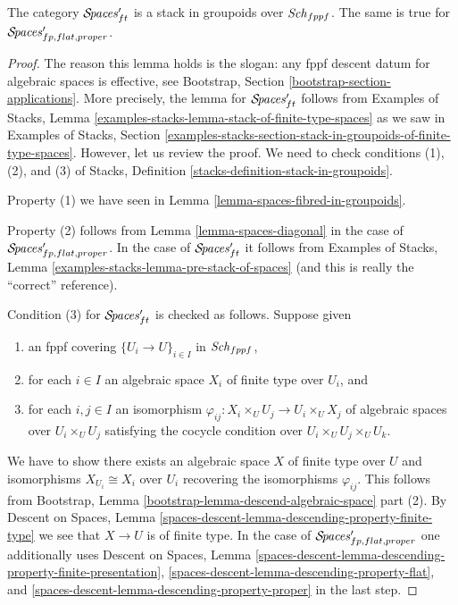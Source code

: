 \begin{lemma}
\label{lemma-spaces-stack}
The category $\mathcal{S}\!\mathit{paces}'_{ft}$ is a stack in groupoids
over $\mathit{Sch}_{fppf}$. The same is true for
$\mathcal{S}\!\mathit{paces}'_{fp, flat, proper}$.
\end{lemma}

\begin{proof}
The reason this lemma holds is the slogan: any fppf descent datum for algebraic
spaces is effective, see Bootstrap, Section
\ref{bootstrap-section-applications}.
More precisely, the lemma for $\mathcal{S}\!\mathit{paces}'_{ft}$ follows from
Examples of Stacks, Lemma
\ref{examples-stacks-lemma-stack-of-finite-type-spaces}
as we saw in Examples of Stacks, Section
\ref{examples-stacks-section-stack-in-groupoids-of-finite-type-spaces}.
However, let us review the proof. We need to check conditions
(1), (2), and (3) of Stacks, Definition
\ref{stacks-definition-stack-in-groupoids}.

\medskip\noindent
Property (1) we have seen in Lemma \ref{lemma-spaces-fibred-in-groupoids}.

\medskip\noindent
Property (2) follows from
Lemma \ref{lemma-spaces-diagonal} in the case of
$\mathcal{S}\!\mathit{paces}'_{fp, flat, proper}$.
In the case of $\mathcal{S}\!\mathit{paces}'_{ft}$ it follows
from Examples of Stacks, Lemma
\ref{examples-stacks-lemma-pre-stack-of-spaces}
(and this is really the ``correct'' reference).

\medskip\noindent
Condition (3) for $\mathcal{S}\!\mathit{paces}'_{ft}$ is checked as follows. Suppose given
\begin{enumerate}
\item an fppf covering $\{U_i \to U\}_{i \in I}$ in $\mathit{Sch}_{fppf}$,
\item for each $i \in I$ an algebraic space $X_i$ of finite type over
$U_i$, and
\item for each $i, j \in I$ an isomorphism
$\varphi_{ij} : X_i \times_U U_j \to U_i \times_U X_j$ of algebraic spaces
over $U_i \times_U U_j$ satisfying the cocycle condition over
$U_i \times_U U_j \times_U U_k$.
\end{enumerate}
We have to show there exists an algebraic space $X$ of finite type over $U$
and isomorphisms $X_{U_i} \cong X_i$ over $U_i$ recovering the
isomorphisms $\varphi_{ij}$. This follows from
Bootstrap, Lemma \ref{bootstrap-lemma-descend-algebraic-space} part (2).
By Descent on Spaces, Lemma
\ref{spaces-descent-lemma-descending-property-finite-type}
we see that $X \to U$ is of finite type.
In the case of $\mathcal{S}\!\mathit{paces}'_{fp, flat, proper}$
one additionally uses
Descent on Spaces, Lemma
\ref{spaces-descent-lemma-descending-property-finite-presentation},
\ref{spaces-descent-lemma-descending-property-flat}, and
\ref{spaces-descent-lemma-descending-property-proper}
in the last step.
\end{proof}

